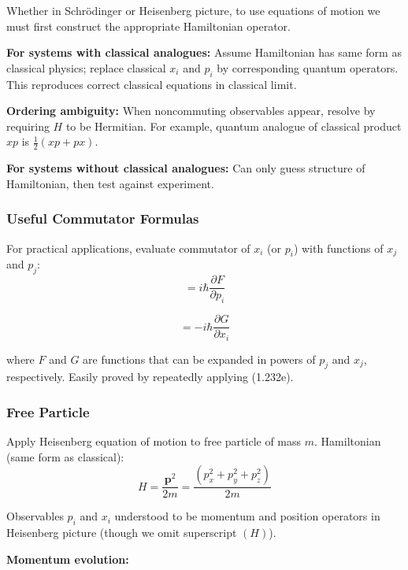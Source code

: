 \documentclass[11pt,a4paper]{article}
\begin{document}
Whether in Schrödinger or Heisenberg picture, to use equations of motion we must first construct the appropriate Hamiltonian operator.

\textbf{For systems with classical analogues:} Assume Hamiltonian has same form as classical physics; replace classical $x_i$ and $p_i$ by corresponding quantum operators. This reproduces correct classical equations in classical limit.

\textbf{Ordering ambiguity:} When noncommuting observables appear, resolve by requiring $H$ to be Hermitian. For example, quantum analogue of classical product $xp$ is $\frac{1}{2}(xp + px)$.

\textbf{For systems without classical analogues:} Can only guess structure of Hamiltonian, then test against experiment.

\subsubsection{Useful Commutator Formulas}

For practical applications, evaluate commutator of $x_i$ (or $p_i$) with functions of $x_j$ and $p_j$:
\begin{equation}
[x_i, F(\mathbf{p})] = i\hbar\frac{\partial F}{\partial p_i}
\tag{2.97a}
\end{equation}

\begin{equation}
[p_i, G(\mathbf{x})] = -i\hbar\frac{\partial G}{\partial x_i}
\tag{2.97b}
\end{equation}

where $F$ and $G$ are functions that can be expanded in powers of $p_j$ and $x_j$, respectively. Easily proved by repeatedly applying (1.232e).

\subsubsection{Free Particle}

Apply Heisenberg equation of motion to free particle of mass $m$. Hamiltonian (same form as classical):
\begin{equation}
H = \frac{\mathbf{p}^2}{2m} = \frac{(p_x^2 + p_y^2 + p_z^2)}{2m}
\tag{2.98}
\end{equation}

Observables $p_i$ and $x_i$ understood to be momentum and position operators in Heisenberg picture (though we omit superscript $(H)$).

\textbf{Momentum evolution:}
\end{document}
